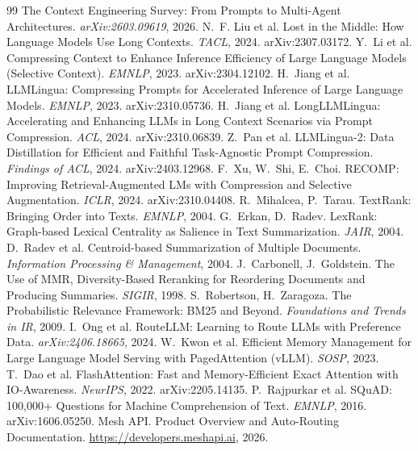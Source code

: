 \documentclass[11pt]{article}
\begin{document}

\begin{thebibliography}{99}
 The Context Engineering Survey: From Prompts to Multi-Agent Architectures. \emph{arXiv:2603.09619}, 2026.
 N.~F. Liu et al. Lost in the Middle: How Language Models Use Long Contexts. \emph{TACL}, 2024. arXiv:2307.03172.
 Y.~Li et al. Compressing Context to Enhance Inference Efficiency of Large Language Models (Selective Context). \emph{EMNLP}, 2023. arXiv:2304.12102.
 H.~Jiang et al. LLMLingua: Compressing Prompts for Accelerated Inference of Large Language Models. \emph{EMNLP}, 2023. arXiv:2310.05736.
 H.~Jiang et al. LongLLMLingua: Accelerating and Enhancing LLMs in Long Context Scenarios via Prompt Compression. \emph{ACL}, 2024. arXiv:2310.06839.
 Z.~Pan et al. LLMLingua-2: Data Distillation for Efficient and Faithful Task-Agnostic Prompt Compression. \emph{Findings of ACL}, 2024. arXiv:2403.12968.
 F.~Xu, W.~Shi, E.~Choi. RECOMP: Improving Retrieval-Augmented LMs with Compression and Selective Augmentation. \emph{ICLR}, 2024. arXiv:2310.04408.
 R.~Mihalcea, P.~Tarau. TextRank: Bringing Order into Texts. \emph{EMNLP}, 2004.
 G.~Erkan, D.~Radev. LexRank: Graph-based Lexical Centrality as Salience in Text Summarization. \emph{JAIR}, 2004.
 D.~Radev et al. Centroid-based Summarization of Multiple Documents. \emph{Information Processing \& Management}, 2004.
 J.~Carbonell, J.~Goldstein. The Use of MMR, Diversity-Based Reranking for Reordering Documents and Producing Summaries. \emph{SIGIR}, 1998.
 S.~Robertson, H.~Zaragoza. The Probabilistic Relevance Framework: BM25 and Beyond. \emph{Foundations and Trends in IR}, 2009.
 I.~Ong et al. RouteLLM: Learning to Route LLMs with Preference Data. \emph{arXiv:2406.18665}, 2024.
 W.~Kwon et al. Efficient Memory Management for Large Language Model Serving with PagedAttention (vLLM). \emph{SOSP}, 2023.
 T.~Dao et al. FlashAttention: Fast and Memory-Efficient Exact Attention with IO-Awareness. \emph{NeurIPS}, 2022. arXiv:2205.14135.
 P.~Rajpurkar et al. SQuAD: 100,000+ Questions for Machine Comprehension of Text. \emph{EMNLP}, 2016. arXiv:1606.05250.
 Mesh API. Product Overview and Auto-Routing Documentation. \url{https://developers.meshapi.ai}, 2026.
\end{thebibliography}
\end{document}
